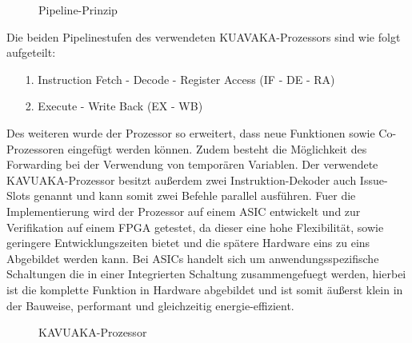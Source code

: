\newpage
\begin{scriptsize}
	\begin{figure}[htbp] 
		\centering
		
		\caption{Pipeline-Prinzip}
		\label{fig:pipeline}
	\end{figure}
\end{scriptsize}

Die beiden Pipelinestufen des verwendeten KUAVAKA-Prozessors sind wie folgt aufgeteilt:
\begin{itemize}
	\item[1.] Instruction Fetch - Decode - Register Access (IF - DE - RA) 
	\item[2.] Execute - Write Back (EX - WB)
\end{itemize}

Des weiteren wurde der Prozessor so erweitert, dass neue Funktionen sowie Co-Prozessoren eingefügt werden können. Zudem besteht die Möglichkeit des Forwarding bei der Verwendung von temporären Variablen.
Der verwendete KAVUAKA-Prozessor besitzt außerdem zwei Instruktion-Dekoder auch Issue-Slots genannt und kann somit zwei Befehle parallel ausführen.
Fuer die Implementierung wird der Prozessor auf einem ASIC entwickelt und zur Verifikation auf einem FPGA getestet, da dieser eine hohe Flexibilität, sowie geringere Entwicklungszeiten bietet und die spätere Hardware eins zu eins Abgebildet werden kann.\cite{lukasglitches2017}
Bei ASICs handelt sich um anwendungsspezifische Schaltungen die in einer Integrierten Schaltung zusammengefuegt werden, hierbei ist die komplette Funktion in Hardware abgebildet und ist somit äußerst klein in der Bauweise, performant und gleichzeitig energie-effizient. 

\begin{scriptsize}
	\begin{figure}[htbp] 
		\centering
		
		\caption[KAVUAKA-Prozessor]{KAVUAKA-Prozessor \cite{lukasglitches2017}}
		\label{fig:KAVUAKA}
	\end{figure}
\end{scriptsize}


